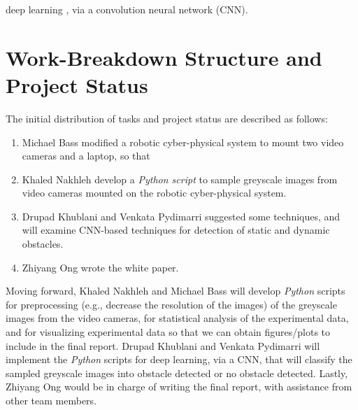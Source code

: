 \documentclass[letter,12pt]{article}
\begin{document}
deep learning \cite{Buduma2017,Ketkar2017,Pattanayak2017,Goodfellow2016,Wang2016,Bengio2015,Cho2014,Goodfellow2014}, via a convolution neural network (CNN).






\section{Work-Breakdown Structure and Project Status}
\label{sec:WorkBreakdownStructureAndProjectStatus}

The initial distribution of tasks and project status are described as follows: \vspace{-0.3cm}
\begin{enumerate} \itemsep -4pt
\item Michael Bass modified a robotic cyber-physical system to mount two video cameras and a laptop, so that 
\item Khaled Nakhleh develop a {\it Python script} to sample greyscale images from video cameras mounted on the robotic cyber-physical system.
\item Drupad Khublani and Venkata Pydimarri suggested some techniques, and will examine CNN-based techniques for detection of static and dynamic obstacles.
\item Zhiyang Ong wrote the white paper.
\end{enumerate}

Moving forward, Khaled Nakhleh and Michael Bass will develop {\it Python} scripts for preprocessing (e.g., decrease the resolution of the images) of the greyscale images from the video cameras, for statistical analysis of the experimental data, and for visualizing experimental data so that we can obtain figures/plots to include in the final report. Drupad Khublani and Venkata Pydimarri will implement the {\it Python} scripts for deep learning, via a CNN, that will classify the sampled greyscale images into obstacle detected or no obstacle detected. Lastly, Zhiyang Ong would be in charge of writing the final report, with assistance from other team members.
\end{document}

